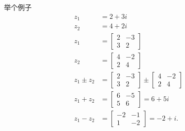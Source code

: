 举个例子
$$
\begin{aligned}
z_{1} & =2+3 i \\
z_{2} & =4+2 i \\
z_{1} & =\left[\begin{array}{cc}
2 & -3 \\
3 & 2
\end{array}\right] \\
z_{2} & =\left[\begin{array}{cc}
4 & -2 \\
2 & 4
\end{array}\right] \\
z_{1} \pm z_{2} & =\left[\begin{array}{cc}
2 & -3 \\
3 & 2
\end{array}\right] \pm\left[\begin{array}{cc}
4 & -2 \\
2 & 4
\end{array}\right] \\
z_{1}+z_{2} & =\left[\begin{array}{cc}
6 & -5 \\
5 & 6
\end{array}\right]=6+5 i \\
z_{1}-z_{2} & =\left[\begin{array}{cc}
-2 & -1 \\
1 & -2
\end{array}\right]=-2+i .
\end{aligned}
$$


